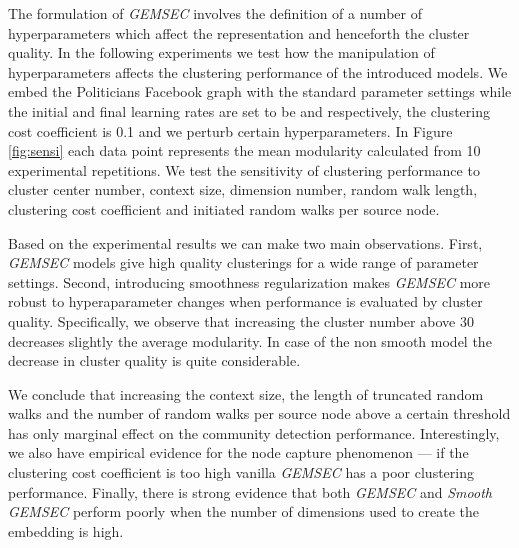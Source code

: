 The formulation of \textit{GEMSEC} involves the definition of a number of hyperparameters which affect the representation and henceforth the cluster quality. In the following experiments we test how the manipulation of hyperparameters affects the clustering performance of the introduced models. We embed the Politicians Facebook graph with the standard parameter settings while  the initial and final learning rates are set to be  and  respectively, the clustering cost coefficient is 0.1 and we perturb certain hyperparameters. In Figure \ref{fig:sensi} each data point represents the mean modularity calculated from 10 experimental repetitions. We test the sensitivity of clustering performance to cluster center number, context size, dimension number, random walk length, clustering cost coefficient and initiated random walks per source node.

Based on the experimental results we can make two main observations. First, \textit{GEMSEC} models give high quality clusterings for a wide range of parameter settings. Second, introducing smoothness regularization makes \textit{GEMSEC} more robust to hyperaparameter changes when performance is evaluated by cluster quality. Specifically, we observe that increasing the cluster number above 30 decreases slightly the average modularity. In case of the non smooth model the decrease in cluster quality is quite considerable.

 We conclude that increasing the context size, the length of truncated random walks and the number of random walks per source node above a certain threshold has only marginal effect on the community detection performance. Interestingly, we also have empirical evidence for the node capture phenomenon --- if the clustering cost coefficient is too high vanilla \textit{GEMSEC} has a poor clustering performance. Finally, there is strong evidence that both \textit{GEMSEC} and \textit{Smooth GEMSEC} perform poorly when the number of dimensions used to create the embedding is high.
 
